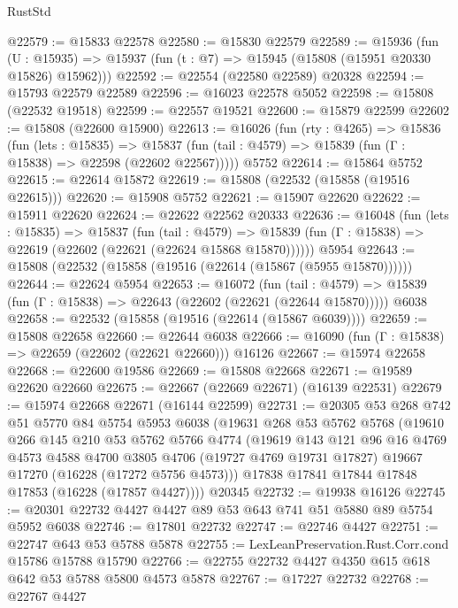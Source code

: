\begin{lexlean}{RustStd}
\begin{coremodule}
@22579 := @15833 @22578
@22580 := @15830 @22579
@22589 := @15936
    (fun (U : @15935) => @15937 (fun (t : @7) => @15945 (@15808 (@15951 @20330 @15826) @15962)))
@22592 := @22554 (@22580 @22589) @20328
@22594 := @15793 @22579 @22589
@22596 := @16023 @22578 @5052
@22598 := @15808 (@22532 @19518)
@22599 := @22557 @19521
@22600 := @15879 @22599
@22602 := @15808 (@22600 @15900)
@22613 := @16026
    (fun (rty : @4265) =>
    @15836
      (fun (lets : @15835) =>
      @15837 (fun (tail : @4579) => @15839 (fun (Γ : @15838) => @22598 (@22602 @22567)))))
    @5752
@22614 := @15864 @5752
@22615 := @22614 @15872
@22619 := @15808 (@22532 (@15858 (@19516 @22615)))
@22620 := @15908 @5752
@22621 := @15907 @22620
@22622 := @15911 @22620
@22624 := @22622 @22562 @20333
@22636 := @16048
    (fun (lets : @15835) =>
    @15837
      (fun (tail : @4579) =>
      @15839 (fun (Γ : @15838) => @22619 (@22602 (@22621 (@22624 @15868 @15870))))))
    @5954
@22643 := @15808 (@22532 (@15858 (@19516 (@22614 (@15867 (@5955 @15870))))))
@22644 := @22624 @5954
@22653 := @16072
    (fun (tail : @4579) => @15839 (fun (Γ : @15838) => @22643 (@22602 (@22621 (@22644 @15870)))))
    @6038
@22658 := @22532 (@15858 (@19516 (@22614 (@15867 @6039))))
@22659 := @15808 @22658
@22660 := @22644 @6038
@22666 := @16090 (fun (Γ : @15838) => @22659 (@22602 (@22621 @22660))) @16126
@22667 := @15974 @22658
@22668 := @22600 @19586
@22669 := @15808 @22668
@22671 := @19589 @22620 @22660
@22675 := @22667 (@22669 @22671) (@16139 @22531)
@22679 := @15974 @22668 @22671 (@16144 @22599)
@22731 := @20305
    @53
    @268
    @742
    @51
    @5770
    @84
    @5754
    @5953
    @6038
    (@19631
      @268
      @53
      @5762
      @5768
      (@19610
        @266
        @145
        @210
        @53
        @5762
        @5766
        @4774
        (@19619
          @143
          @121
          @96
          @16
          @4769
          @4573
          @4588
          @4700
          @3805
          @4706
          (@19727 @4769 @19731 @17827)
          @19667
          @17270
          (@16228 (@17272 @5756 @4573)))
        @17838
        @17841
        @17844
        @17848
        @17853
        (@16228 (@17857 @4427))))
    @20345
@22732 := @19938 @16126
@22745 := @20301 @22732 @4427 @4427 @89 @53 @643 @741 @51 @5880 @89 @5754 @5952 @6038
@22746 := @17801 @22732
@22747 := @22746 @4427
@22751 := @22747 @643 @53 @5788 @5878
@22755 := LexLeanPreservation.Rust.Corr.cond @15786 @15788 @15790
@22766 := @22755 @22732 @4427 @4350 @615 @618 @642 @53 @5788 @5800 @4573 @5878
@22767 := @17227 @22732
@22768 := @22767 @4427

\end{coremodule}
\end{lexlean}
